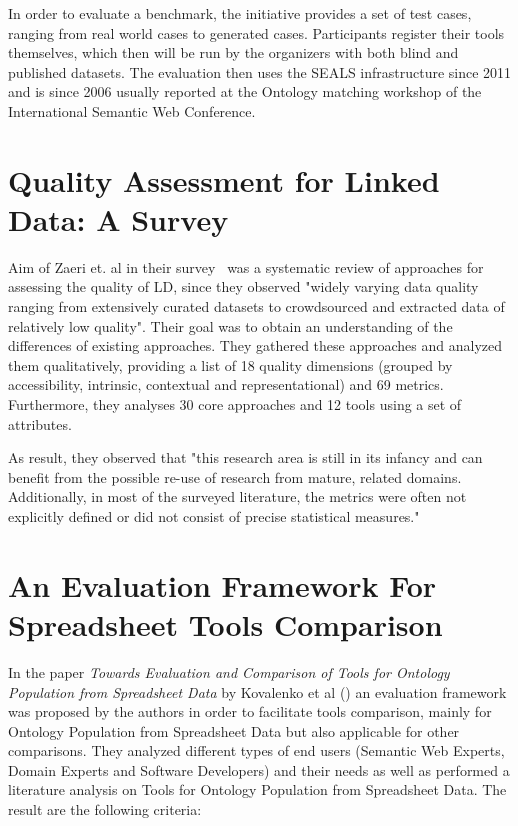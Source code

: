 In order to evaluate a benchmark, the initiative provides a set of test cases, 
ranging from real world cases to generated cases. Participants register their 
tools themselves, which then will be run by the organizers with both blind and 
published datasets. The evaluation then uses the SEALS infrastructure since 2011 
and is since 2006 usually reported at the Ontology matching workshop of the 
International Semantic Web Conference.

\section{Quality Assessment for Linked Data: A Survey}

Aim of Zaeri et. al in their survey~\cite{zaveri2016quality} was a systematic 
review of approaches for assessing the quality of LD, since they observed "widely 
varying data quality ranging from extensively curated datasets to crowdsourced and 
extracted data of relatively low quality". Their goal was to obtain an 
understanding of the differences of existing approaches. They gathered these 
approaches and analyzed them qualitatively, providing a list of 18 quality 
dimensions (grouped by accessibility, intrinsic, contextual and representational) 
and 69 metrics. Furthermore, they analyses 30 core approaches and 12 tools using a 
set of attributes.

As result, they observed that "this research area is still in its infancy and can 
benefit from the possible re-use of research from mature, related domains. 
Additionally, in most of the surveyed literature, the metrics were often not 
explicitly defined or did not consist of precise statistical measures."

\section{An Evaluation Framework For Spreadsheet Tools Comparison}

In the paper \emph{Towards Evaluation and Comparison of Tools for Ontology 
Population from Spreadsheet Data} by Kovalenko et al (\cite{kovalenko2013towards}) 
an evaluation framework was proposed by the authors in order to facilitate tools 
comparison, mainly for Ontology Population from Spreadsheet Data but also 
applicable for other comparisons. They analyzed different types of end users 
(Semantic Web Experts, Domain Experts and Software Developers) and their needs as 
well as performed a literature analysis on Tools for Ontology Population from 
Spreadsheet Data. The result are the following criteria:

